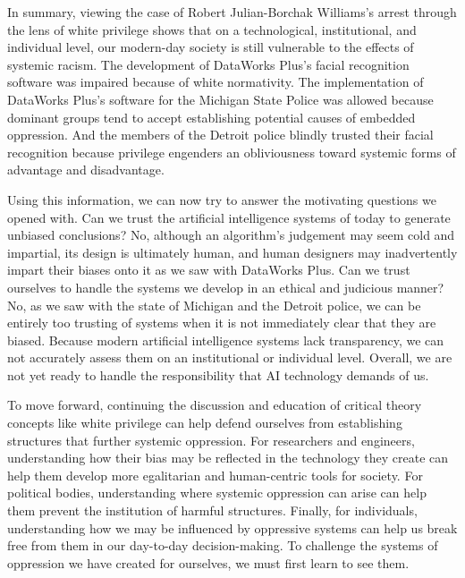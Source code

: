 \documentclass[12pt, letterpaper]{article}
\begin{document}
\begin{mla}
In summary, viewing the case of Robert Julian-Borchak Williams's arrest
through the lens of white privilege shows that on a technological,
institutional, and individual level, our modern-day society is still
vulnerable to the effects of systemic racism. The development of DataWorks
Plus's facial recognition software was impaired because of white normativity.
The implementation of DataWorks Plus's software for the Michigan State Police
was allowed because dominant groups tend to accept establishing potential
causes of embedded oppression. And the members of the Detroit police blindly
trusted their facial recognition because privilege engenders an obliviousness
toward systemic forms of advantage and disadvantage.

Using this information, we can now try to answer the motivating questions we
opened with. Can we trust the artificial intelligence systems of today to
generate unbiased conclusions? No, although an algorithm's judgement may seem
cold and impartial, its design is ultimately human, and human designers may
inadvertently impart their biases onto it as we saw with DataWorks Plus. Can
we trust ourselves to handle the systems we develop in an ethical and
judicious manner? No, as we saw with the state of Michigan and the Detroit
police, we can be entirely too trusting of systems when it is not immediately
clear that they are biased. Because modern artificial intelligence systems
lack transparency, we can not accurately assess them on an institutional or
individual level. Overall, we are not yet ready to handle the responsibility
that AI technology demands of us.

To move forward, continuing the discussion and education of critical theory
concepts like white privilege can help defend ourselves from establishing
structures that further systemic oppression. For researchers and engineers,
understanding how their bias may be reflected in the technology they create
can help them develop more egalitarian and human-centric tools for society.
For political bodies, understanding where systemic oppression can arise can
help them prevent the institution of harmful structures. Finally, for
individuals, understanding how we may be influenced by oppressive systems can
help us break free from them in our day-to-day decision-making. To challenge
the systems of oppression we have created for ourselves, we must first learn
to see them.





\end{mla}
\end{document}
